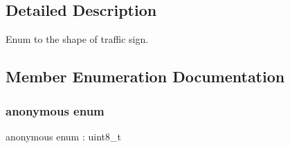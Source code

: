 \subsection{Detailed Description}
Enum to the shape of traffic sign. 

\subsection{Member Enumeration Documentation}
\mbox{\label{structmaf__perception__interface_1_1TrafficSignShapeEnum_a264a04485d9d5f9777d855e1525d0344}} 
\subsubsection{\texorpdfstring{anonymous enum}{anonymous enum}}
{\footnotesize\ttfamily anonymous enum \+: uint8\+\_\+t}

